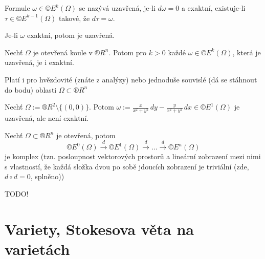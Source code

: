 \documentclass[12pt]{article}					%
\begin{document}
        \begin{definice}
            Formule $\omega \in ©E^k(\Omega)$ se nazývá uzavřená, je-li $d\omega = 0$ a exaktní, existuje-li $\tau \in ©E^{k-1}(\Omega)$ takové, že $d\tau = \omega$.
        \end{definice}

        \begin{poznamka}[Platí]
            Je-li $\omega$ exaktní, potom je uzavřená.
        \end{poznamka}

        \begin{lemma}
            Nechť $\Omega$ je otevřená koule v $®R^n$. Potom pro $k>0$ každé $\omega \in ©E^k(\Omega)$, která je uzavřená, je i exaktní.
            
            \begin{poznamkain}
                    Platí i pro hvězdovité (znáte z analýzy) nebo jednoduše souvislé (dá se stáhnout do bodu) oblasti $\Omega \subset ®R^n$
            \end{poznamkain}
        \end{lemma}

        \begin{poznamka}
            Nechť $\Omega := ®R^2 \setminus \{(0, 0)\}$. Potom $\omega := \frac{x}{x^2 + y^2}\,dy - \frac{y}{x^2 + y^2}\,dx \in ©E^1(\Omega)$ je uzavřená, ale není exaktní.
        \end{poznamka}

        \begin{definice}
            Nechť $\Omega \subset ®R^n$ je otevřená, potom
            $$ ©E^0(\Omega) \overset{d}{\rightarrow} ©E^1(\Omega) \overset{d}{\rightarrow} … \overset{d}{\rightarrow} ©E^n(\Omega) $$
            je komplex (tzn. posloupnost vektorových prostorů a lineární zobrazení mezi nimi s vlastností, že každá složka dvou po sobě jdoucích zobrazení je triviální (zde, $d\circ d = 0$, splněno))
        \end{definice}

        TODO!

\section{Variety, Stokesova věta na varietách}

    
\end{document}
